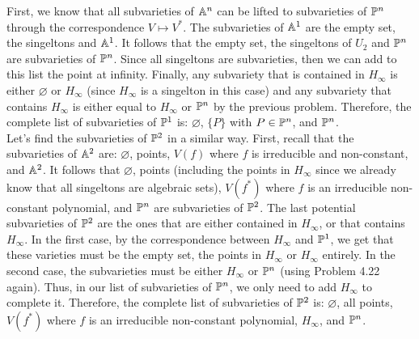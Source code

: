 \begin{solution}
    First, we know that all subvarieties of $\A^n$ can be lifted to subvarieties of $\P^n$ through the correspondence $V \mapsto V^*$. The subvarieties of $\A^1$ are the empty set, the singeltons and $\A^1$. It follows that the empty set, the singeltons of $U_2$ and $\P^n$ are subvarieties of $\P^n$. Since all singeltons are subvarieties, then we can add to this list the point at infinity. Finally, any subvariety that is contained in $H_{\infty}$ is either $\varnothing$ or $H_{\infty}$ (since $H_\infty$ is a singelton in this case) and any subvariety that contains $H_{\infty}$ is either equal to $H_{\infty}$ or $\P^n$ by the previous problem. Therefore, the complete list of subvarieties of $\P^1$ is: $\varnothing$, $\{P\}$ with $P \in \P^n$, and $\P^n$. \\
    
    Let's find the subvarieties of $\P^2$ in a similar way. First, recall that the subvarieties of $\A^2$ are: $\varnothing$, points, $V(f)$ where $f$ is irreducible and non-constant, and $\A^2$. It follows that $\varnothing$, points (including the points in $H_{\infty}$ since we already know that all singeltons are algebraic sets), $V(f^*)$ where $f$ is an irreducible non-constant polynomial, and $\P^n$ are subvarieties of $\P^2$. The last potential subvarieties of $\P^2$ are the ones that are either contained in $H_{\infty}$, or that contains $H_{\infty}$. In the first case, by the correspondence between $H_{\infty}$ and $\P^1$, we get that these varieties must be the empty set, the points in $H_{\infty}$ or $H_{\infty}$ entirely. In the second case, the subvarieties must be either $H_{\infty}$ or $\P^n$ (using Problem 4.22 again). Thus, in our list of subvarieties of $\P^n$, we only need to add $H_{\infty}$ to complete it. Therefore, the complete list of subvarieties of $\P^2$ is: $\varnothing$, all points, $V(f^*)$ where $f$ is an irreducible non-constant polynomial, $H_{\infty}$, and $\P^n$. \\
\end{solution}

\begin{exercise}
    \td \\
\end{exercise}

\begin{solution}
    \td \\
\end{solution}

\begin{exercise}
    \td \\
\end{exercise}

\begin{solution}
    \td \\
\end{solution}

